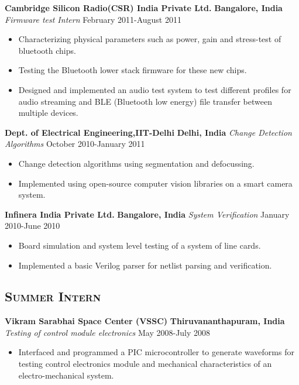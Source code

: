 \documentclass[10pt]{article}
\begin{document}
\noindent \textbf{Cambridge Silicon Radio(CSR) India Private Ltd.} \hfill \textbf{Bangalore, India} \newline
\textit{Firmware test Intern} \hfill February 2011-August 2011
\begin{itemize}
\item Characterizing physical parameters such as power, gain and stress-test of bluetooth chips.
\item Testing the Bluetooth lower stack firmware for these new chips.
\item Designed and implemented an audio test system to test different profiles for audio streaming and BLE (Bluetooth low energy) file transfer between multiple devices.
\end{itemize}

\noindent \textbf{Dept. of Electrical Engineering,IIT-Delhi} \hfill \textbf{Delhi, India}  \newline
\textit{Change Detection Algorithms} \hfill October 2010-January 2011
\begin{itemize}
\item Change detection algorithms using segmentation and defocussing.
\item Implemented using open-source computer vision libraries on a smart camera system.
\end{itemize}

\noindent \textbf{Infinera India Private Ltd.} \hfill \textbf{Bangalore, India} \newline
\textit{System Verification} \hfill January 2010-June 2010
\begin{itemize}
\item Board simulation and system level testing of a system of line cards.
\item Implemented a basic Verilog parser for netlist parsing and verification.
\end{itemize}

\subsection*{\textsc{\large Summer Intern}}
\textbf{Vikram Sarabhai Space Center (VSSC)} \hfill \textbf{Thiruvananthapuram, India} \newline 
\textit{Testing of control module electronics} \hfill May 2008-July 2008
\begin{itemize}
\item Interfaced and programmed a PIC microcontroller to generate waveforms for testing control electronics module and mechanical characteristics of an electro-mechanical system.
\end{itemize}
\end{document}
